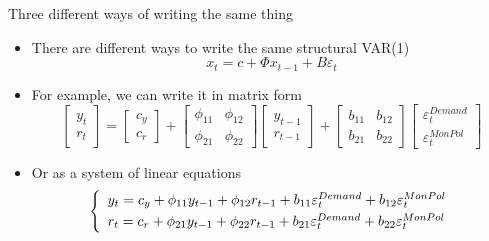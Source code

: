 \documentclass[10pt,handout]{beamer}
\begin{document}
\begin{frame}
{Three different ways of writing the same thing}
\begin{itemize}
\item There are different ways to write the same structural VAR(1)
\begin{equation*}
x_{t}=c+\Phi x_{t-1}+B\varepsilon_{t}
\end{equation*}%
\pause\vspace{-0.3cm}
\item For example, we can write it in matrix form%
\begin{equation*}
\begin{bmatrix}
y_{t} \\
r_{t}%
\end{bmatrix}%
=%
\begin{bmatrix}
c_{y} \\
c_{r}%
\end{bmatrix}%
+%
\begin{bmatrix}
\phi _{11} & \phi _{12} \\
\phi _{21} & \phi _{22}%
\end{bmatrix}%
\begin{bmatrix}
y_{t-1} \\
r_{t-1}%
\end{bmatrix}%
+%
\begin{bmatrix}
b_{11} & b_{12} \\
b_{21} & b_{22}%
\end{bmatrix}%
\begin{bmatrix}
\varepsilon_{t}^{Demand} \\
\varepsilon_{t}^{MonPol}%
\end{bmatrix}%
\end{equation*}%
\pause
\item Or as a system of linear equations%
\begin{equation*}
\left\{
\begin{array}{l}
y_{t}=c_y+\phi _{11}y_{t-1}+\phi _{12}r_{t-1}+b_{11}\varepsilon_{t}^{Demand}+b_{12}\varepsilon_{t}^{MonPol}\smallskip \\
r_{t}=c_r+\phi _{21}y_{t-1}+\phi _{22}r_{t-1}+b_{21}\varepsilon_{t}^{Demand}+b_{22}\varepsilon_{t}^{MonPol}%
\end{array}%
\right.
\end{equation*}
\end{itemize}
\end{frame}
\shownotesblock{}
\end{document}
